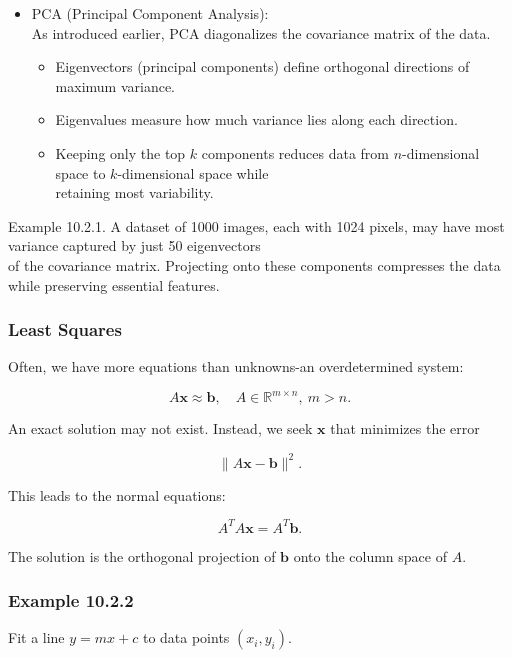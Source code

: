 \documentclass[
  12pt,
  a4paper,
]{article}
\begin{document}
\begin{itemize}
\item
  PCA (Principal Component Analysis):\\
  As introduced earlier, PCA diagonalizes the covariance matrix of the
  data.

  \begin{itemize}
  \item
    Eigenvectors (principal components) define orthogonal directions of
    maximum variance.
  \item
    Eigenvalues measure how much variance lies along each direction.
  \item
    Keeping only the top \(k\) components reduces data from
    \(n\)-dimensional space to \(k\)-dimensional space while\\
    retaining most variability.
  \end{itemize}
\end{itemize}

Example 10.2.1. A dataset of 1000 images, each with 1024 pixels, may
have most variance captured by just 50 eigenvectors\\
of the covariance matrix. Projecting onto these components compresses
the data while preserving essential features.

\subsubsection{Least Squares}\label{least-squares}

Often, we have more equations than unknowns-an overdetermined system:

\[A\mathbf{x} \approx \mathbf{b}, \quad A \in \mathbb{R}^{m \times n}, \ m > n.\]

An exact solution may not exist. Instead, we seek \(\mathbf{x}\) that
minimizes the error

\[\|A\mathbf{x} - \mathbf{b}\|^2.\]

This leads to the normal equations:

\[A^T A \mathbf{x} = A^T \mathbf{b}.\]

The solution is the orthogonal projection of \(\mathbf{b}\) onto the
column space of \(A\).

\subsubsection{Example 10.2.2}\label{example-1022}

Fit a line \(y = mx + c\) to data points \((x_i, y_i)\).
\end{document}
